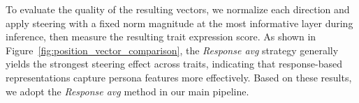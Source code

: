 To evaluate the quality of the resulting vectors, we normalize each direction and apply steering with a fixed norm magnitude at the most informative layer during inference, then measure the resulting trait expression score. As shown in Figure~\ref{fig:position_vector_comparison}, the \textit{Response avg} strategy generally yields the strongest steering effect across traits, indicating that response-based representations capture persona features more effectively. Based on these results, we adopt the \textit{Response avg} method in our main pipeline.


